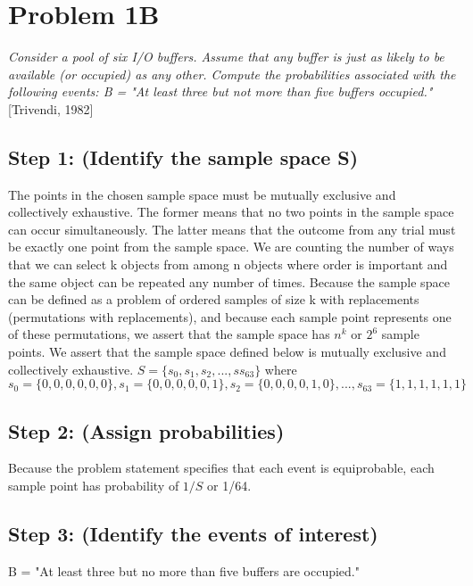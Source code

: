 \documentclass[a4paper,10pt]{article}
\title{}
\author{Mark Johnson \\
Loyola University Chicago}
\date {mjohnson4@luc.edu}
\begin{document}
\maketitle

\section{Problem 1B}
\emph{Consider a pool of six I/O buffers. Assume that any buffer is just as likely to be available (or occupied) as 
any other. Compute the probabilities associated with the following events: \newline
B = "At least three but not more than five buffers occupied."} [Trivendi, 1982]

\subsection{Step 1: (Identify the sample space S)}
The points in the chosen sample space must be mutually exclusive and collectively exhaustive. The former means that 
no two points in the sample space can occur simultaneously. The latter means that the outcome from any trial must be 
exactly one point from the sample space. We are counting the number of ways that we can select k objects from among n 
objects where order is important and the same object can be repeated any number of times. Because the sample space 
can be defined as a problem of ordered samples of size k with replacements (permutations with replacements), and 
because each sample point represents one of these permutations, we assert that the sample space has $ n^{k} $ or $ 2 
^{6} $ sample points. We assert that the sample space defined below is mutually exclusive and collectively 
exhaustive. \newline
$ S = \{s_{0}, s_{1}, s_{2},...,ss_{63}\} $ where \newline
$ s_{0} = \{0,0,0,0,0,0\}, s_{1} = \{0,0,0,0,0,1\}, s_{2} = \{0,0,0,0,1,0\},...,s_{63} = \{1,1,1,1,1,1\} $

\subsection{Step 2: (Assign probabilities)}
Because the problem statement specifies that each event is equiprobable, each sample point has probability of $ 1/S $ 
or 1/64.

\subsection{Step 3: (Identify the events of interest)}
B = "At least three but no more than five buffers are occupied."
\end{document}
